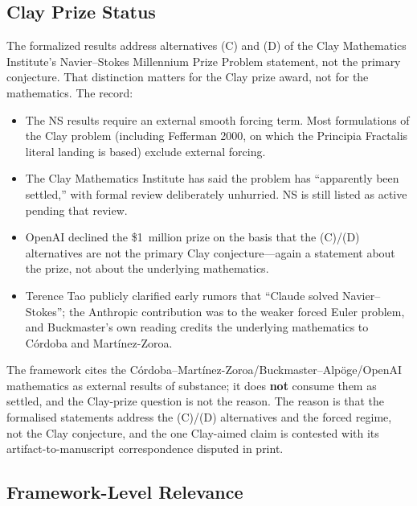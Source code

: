 \subsection{Clay Prize Status}

The formalized results address alternatives (C) and (D) of the Clay
Mathematics Institute's Navier--Stokes Millennium Prize Problem
statement, not the primary conjecture. That distinction matters for
the Clay prize award, not for the mathematics. The record:
\begin{itemize}
\item The NS results require an external smooth forcing term. Most
formulations of the Clay problem (including Fefferman 2000, on which the
Principia Fractalis literal landing is based) exclude external forcing.
\item The Clay Mathematics Institute has said the problem has
``apparently been settled,'' with formal review deliberately
unhurried. NS is still listed as active pending that review.
\item OpenAI declined the \$1~million prize on the basis that the
(C)/(D) alternatives are not the primary Clay conjecture---again a
statement about the prize, not about the underlying mathematics.
\item Terence Tao publicly clarified early rumors that ``Claude solved
Navier--Stokes''; the Anthropic contribution was to the weaker forced
Euler problem, and Buckmaster's own reading credits the underlying
mathematics to C\'ordoba and Mart\'inez-Zoroa.
\end{itemize}
The framework cites the C\'ordoba--Mart\'inez-Zoroa/Buckmaster--Alp\"oge/OpenAI
mathematics as external results of substance; it does \textbf{not} consume them
as settled, and the Clay-prize question is not the reason. The reason is that
the formalised statements address the (C)/(D) alternatives and the forced
regime, not the Clay conjecture, and the one Clay-aimed claim is contested with
its artifact-to-manuscript correspondence disputed in print.

\subsection{Framework-Level Relevance}

